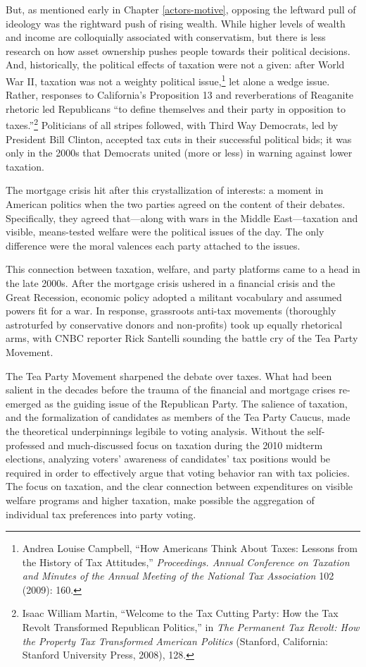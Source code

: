 \documentclass[12pt,oneside]{psthesis}
\begin{document}
But, as mentioned early in Chapter \ref{actors-motive}, opposing the leftward pull of ideology was the rightward push of rising wealth.
While higher levels of wealth and income are colloquially associated with conservatism, but there is less research on how asset ownership pushes people towards their political decisions.
And, historically, the political effects of taxation were not a given: after World War II, taxation was not a weighty political issue,\footnote{Andrea Louise Campbell, ``How Americans Think About Taxes: Lessons from the History of Tax Attitudes,'' \emph{Proceedings. Annual Conference on Taxation and Minutes of the Annual Meeting of the National Tax Association} 102 (2009): 160.} let alone a wedge issue.
Rather, responses to California's Proposition 13 and reverberations of Reaganite rhetoric led Republicans ``to define themselves and their party in opposition to taxes.''\footnote{Isaac William Martin, ``Welcome to the Tax Cutting Party: How the Tax Revolt Transformed Republican Politics,'' in \emph{The Permanent Tax Revolt: How the Property Tax Transformed American Politics} (Stanford, California: Stanford University Press, 2008), 128.}
Politicians of all stripes followed, with Third Way Democrats, led by President Bill Clinton, accepted tax cuts in their successful political bids; it was only in the 2000s that Democrats united (more or less) in warning against lower taxation.

The mortgage crisis hit after this crystallization of interests: a moment in American politics when the two parties agreed on the content of their debates.
Specifically, they agreed that---along with wars in the Middle East---taxation and visible, means-tested welfare were the political issues of the day.
The only difference were the moral valences each party attached to the issues.

This connection between taxation, welfare, and party platforms came to a head in the late 2000s.
After the mortgage crisis ushered in a financial crisis and the Great Recession, economic policy adopted a militant vocabulary and assumed powers fit for a war.
In response, grassroots anti-tax movements (thoroughly astroturfed by conservative donors and non-profits) took up equally rhetorical arms, with CNBC reporter Rick Santelli sounding the battle cry of the Tea Party Movement.

The Tea Party Movement sharpened the debate over taxes.
What had been salient in the decades before the trauma of the financial and mortgage crises re-emerged as the guiding issue of the Republican Party.
The salience of taxation, and the formalization of candidates as members of the Tea Party Caucus, made the theoretical underpinnings legibile to voting analysis.
Without the self-professed and much-discussed focus on taxation during the 2010 midterm elections, analyzing voters' awareness of candidates' tax positions would be required in order to effectively argue that voting behavior ran with tax policies.
The focus on taxation, and the clear connection between expenditures on visible welfare programs and higher taxation, make possible the aggregation of individual tax preferences into party voting.
\end{document}
